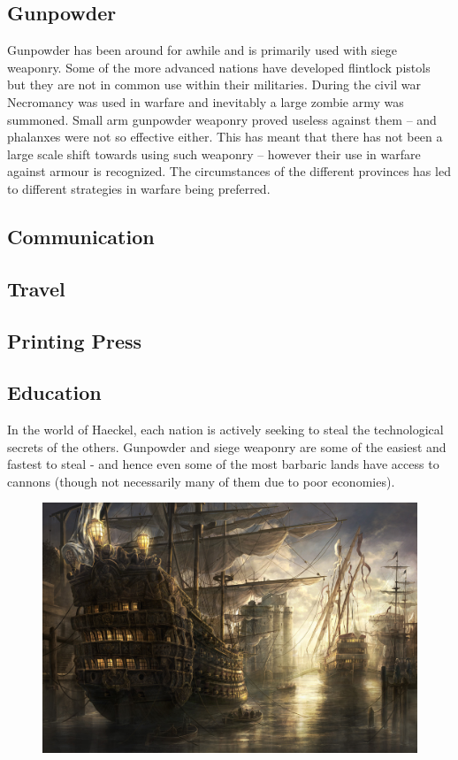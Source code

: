 \begin{multicols}{2}
\subsection{Gunpowder} Gunpowder has been around for awhile and is primarily used with siege weaponry. Some of the more advanced nations have developed flintlock pistols but they are not in common use within their militaries. During the civil war Necromancy was used in warfare and inevitably a large zombie army was summoned. Small arm gunpowder weaponry proved useless against them – and phalanxes were not so effective either. This has meant that there has not been a large scale shift towards using such weaponry – however their use in warfare against armour is recognized. The circumstances of the different provinces has led to different strategies in warfare being preferred.

\subsection{Communication}

\subsection{Travel}

\subsection{Printing Press}

\subsection{Education} 

In the world of Haeckel, each nation is actively seeking to steal the technological secrets of the others. Gunpowder and siege weaponry are some of the easiest and fastest to steal - and hence even some of the most barbaric lands have access to cannons (though not necessarily many of them due to poor economies). 

\begin{figure}[h]
\includegraphics[width=\columnwidth]{La_Rochelle_by_Radojavor}
\end{figure}


\end{multicols}
